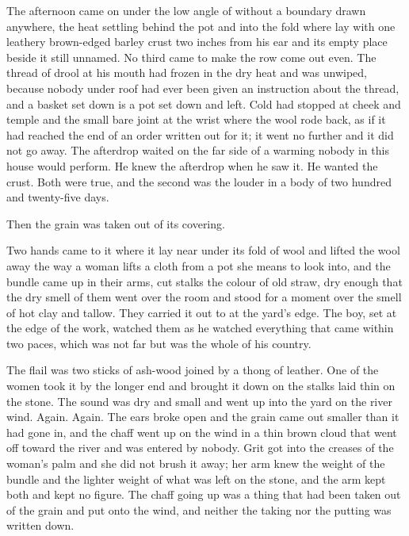 The afternoon came on under the low angle of  without a boundary drawn anywhere, the heat settling behind the pot and into the fold where  lay with one leathery brown-edged barley crust two inches from his ear and its empty place beside it still unnamed. No third came to make the row come out even. The thread of drool at his mouth had frozen in the dry heat and was unwiped, because nobody under  roof had ever been given an instruction about the thread, and a basket set down is a pot set down and left. Cold had stopped at cheek and temple and the small bare joint at the wrist where the wool rode back, as if it had reached the end of an order written out for it; it went no further and it did not go away. The afterdrop waited on the far side of a warming nobody in this house would perform. He knew the afterdrop when he saw it. He wanted the crust. Both were true, and the second was the louder in a body of two hundred and twenty-five days.

Then the grain was taken out of its covering.

Two hands came to it where it lay near  under its fold of wool and lifted the wool away the way a woman lifts a cloth from a pot she means to look into, and the bundle came up in their arms, cut stalks the colour of old straw, dry enough that the dry smell of them went over the room and stood for a moment over the smell of hot clay and tallow. They carried it out to  at the yard's edge. The boy, set at the edge of the work, watched them as he watched everything that came within two paces, which was not far but was the whole of his country.

The flail was two sticks of ash-wood joined by a thong of leather. One of the women took it by the longer end and brought it down on the stalks laid thin on the stone. The sound was dry and small and went up into the yard on the river wind. Again. Again. The ears broke open and the grain came out smaller than it had gone in, and the chaff went up on the wind in a thin brown cloud that went off toward the river and was entered by nobody. Grit got into the creases of the woman's palm and she did not brush it away; her arm knew the weight of the bundle and the lighter weight of what was left on the stone, and the arm kept both and kept no figure. The chaff going up was a thing that had been taken out of the grain and put onto the wind, and neither the taking nor the putting was written down.

